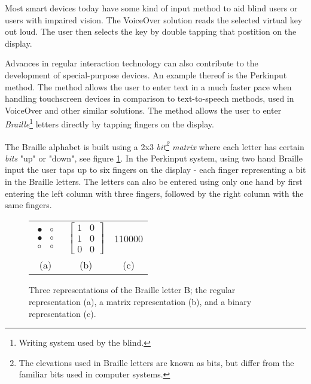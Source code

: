 
Most smart devices today have some kind of input method to aid blind users or users with impaired vision. The VoiceOver solution reads the selected virtual key out loud. The user then selects the key by double tapping that postition on the display\cite{voiceover}.


Advances in regular interaction technology can also contribute to the development of special-purpose devices. An example thereof is the Perkinput method\cite{azenkot}. The method allows the user to enter text in a much faster pace when handling touchscreen devices in comparison to text-to-speech methods, used in VoiceOver and other similar solutions. The method allows the user to enter \emph{Braille}\footnote{Writing system used by the blind.} letters directly by tapping fingers on the display.

The Braille alphabet is built using a 2x3 \emph{bit\footnote{The elevations used in Braille letters are known as bits, but differ from the familiar bits used in computer systems.} matrix} where each letter has certain \emph{bits} "up" or "down", see figure \ref{fig:brailleexample}. In the Perkinput system, using two hand Braille input the user taps up to six fingers on the display - each finger representing a bit in the Braille letters. The letters can also be entered using only one hand by first entering the left column with three fingers, followed by the right column with the same fingers.

\begin{figure}[h!]
\centering

\begin{tabular}{c c c}

$
\begin{array}{cc}
\bullet & \circ \\
\bullet & \circ \\
\circ & \circ \end{array}
$

&

$
\left[ \begin{array}{cc}
1 & 0 \\
1 & 0 \\
0 & 0 \end{array} \right]
$ 

&

110000 \\

(a) & (b) & (c)

\end{tabular}


\caption{Three representations of the Braille letter B; the regular representation (a), a matrix representation (b), and a binary representation (c).}
\label{fig:brailleexample}


\end{figure}


